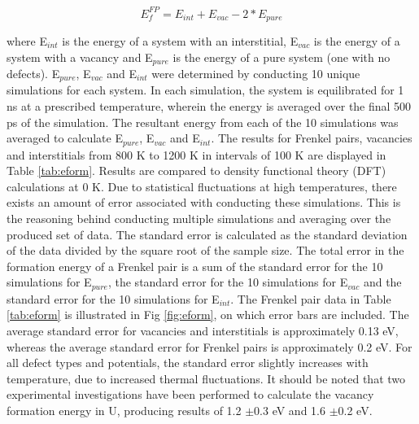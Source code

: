 \documentclass[review]{elsarticle}
\begin{document}
\begin{equation}
\label{eqn:eint}
E_{f}^{FP} = E_{int} + E_{vac} - 2*E_{pure}
\end{equation} 

where E$_{int}$ is the energy of a system with an interstitial, E$_{vac}$ is the energy of a system with a vacancy and E$_{pure}$ is the energy of a pure system (one with no defects). E$_{pure}$, E$_{vac}$ and E$_{int}$ were determined by conducting 10 unique simulations for each system. In each simulation, the system is equilibrated for 1 ns at a prescribed temperature, wherein the energy is averaged over the final 500 ps of the simulation. The resultant energy from each of the 10 simulations was averaged to calculate E$_{pure}$, E$_{vac}$ and E$_{int}$. The results for Frenkel pairs, vacancies and interstitials from 800 K to 1200 K in intervals of 100 K are displayed in Table \ref{tab:eform}. Results are compared to density functional theory (DFT) calculations at 0 K. Due to statistical fluctuations at high temperatures, there exists an amount of error associated with conducting these simulations. This is the reasoning behind conducting multiple simulations and averaging over the produced set of data. The standard error is calculated as the standard deviation of the data divided by the square root of the sample size. The total error in the formation energy of a Frenkel pair is a sum of the standard error for the 10 simulations for E$_{pure}$, the standard error for the 10 simulations for E$_{vac}$ and the standard error for the 10 simulations for E$_{int}$. The Frenkel pair data in Table \ref{tab:eform} is illustrated in Fig \ref{fig:eform}, on which error bars are included. The average standard error for vacancies and interstitials is approximately 0.13 eV, whereas the average standard error for Frenkel pairs is approximately 0.2 eV. For all defect types and potentials, the standard error slightly increases with temperature, due to increased thermal fluctuations. It should be noted that two experimental investigations have been performed to calculate the vacancy formation energy in U, producing results of 1.2 $\pm$0.3 eV\cite{matter1980} and 1.6 $\pm$0.2 eV\cite{lund2013}.
\end{document}
